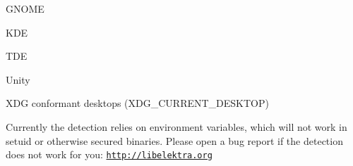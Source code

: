 \begin{DoxyItemize}
\item G\+N\+O\+M\+E
\item K\+D\+E
\item T\+D\+E
\item Unity
\item X\+D\+G conformant desktops ({\ttfamily X\+D\+G\+\_\+\+C\+U\+R\+R\+E\+N\+T\+\_\+\+D\+E\+S\+K\+T\+O\+P})
\end{DoxyItemize}

Currently the detection relies on environment variables, which will not work in setuid or otherwise secured binaries. Please open a bug report if the detection does not work for you\+: \href{http://libelektra.org}{\tt http\+://libelektra.\+org} 